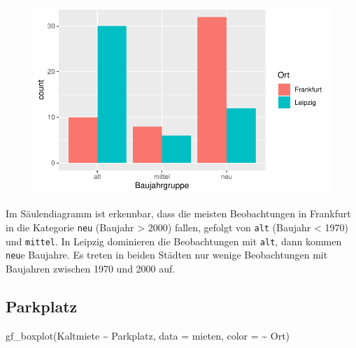 \documentclass[
  a4paper,
  DIV=11]{scrartcl}
\newenvironment{Shaded}{\begin{snugshade}}{\end{snugshade}}
\newcommand{\AttributeTok}[1]{\textcolor[rgb]{0.40,0.45,0.13}{#1}}
\newcommand{\FunctionTok}[1]{\textcolor[rgb]{0.28,0.35,0.67}{#1}}
\newcommand{\NormalTok}[1]{\textcolor[rgb]{0.00,0.23,0.31}{#1}}
\newcommand{\SpecialCharTok}[1]{\textcolor[rgb]{0.37,0.37,0.37}{#1}}
\begin{document}
\begin{figure}[H]

{\centering \includegraphics{Mietmodellierung_files/figure-pdf/unnamed-chunk-11-1.pdf}

}

\end{figure}

Im Säulendiagramm ist erkennbar, dass die meisten Beobachtungen in
Frankfurt in die Kategorie \texttt{neu} (Baujahr \textgreater{} 2000)
fallen, gefolgt von \texttt{alt} (Baujahr \textless{} 1970) und
\texttt{mittel}. In Leipzig dominieren die Beobachtungen mit
\texttt{alt}, dann kommen \texttt{neu}e Baujahre. Es treten in beiden
Städten nur wenige Beobachtungen mit Baujahren zwischen 1970 und 2000
auf.

\hypertarget{parkplatz}{%
\subsection{Parkplatz}\label{parkplatz}}

\begin{Shaded}
\begin{Highlighting}[]
\FunctionTok{gf\_boxplot}\NormalTok{(Kaltmiete }\SpecialCharTok{\textasciitilde{}}\NormalTok{ Parkplatz, }\AttributeTok{data =}\NormalTok{ mieten, }\AttributeTok{color =} \SpecialCharTok{\textasciitilde{}}\NormalTok{ Ort)}
\end{Highlighting}
\end{Shaded}
\end{document}
